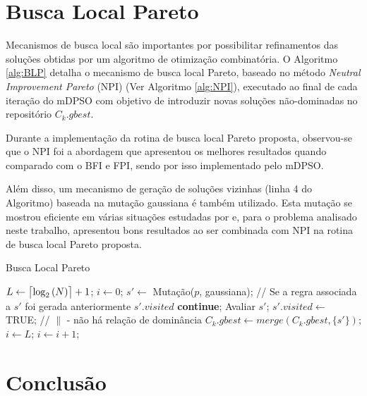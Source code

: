 \documentclass[
	12pt,				%
	openany,			%
	oneside,	
	a4paper,			%
	brazil,				%
	]{unimontes-ppgmsc-abntex2}
\DeclarePairedDelimiter{\ceil}{\lceil}{\rceil}
\begin{document}
\section{Busca Local Pareto}
\label{sec:mdpso_busca_local}

Mecanismos de busca local são importantes por possibilitar refinamentos das soluções obtidas por um algoritmo de otimização combinatória. O Algoritmo \ref{alg:BLP} detalha o mecanismo de busca local Pareto, baseado no método {\em Neutral Improvement Pareto} (NPI) (Ver Algoritmo \ref{alg:NPI}), executado ao final de cada iteração do mDPSO com objetivo de introduzir novas soluções não-dominadas no repositório $C_k.gbest$. 

Durante a implementação da rotina de busca local Pareto proposta, observou-se que o NPI foi a abordagem que apresentou os melhores resultados quando comparado com o BFI e FPI, sendo por isso implementado pelo mDPSO. 

Além disso, um mecanismo de geração de soluções vizinhas (linha 4 do Algoritmo) baseada na mutação gaussiana é também utilizado. Esta mutação se mostrou eficiente em várias situações estudadas por  e, para o problema analisado neste trabalho, apresentou bons resultados ao ser combinada com NPI na rotina de busca local Pareto proposta.  

\begin{algorithm}[ht]
\caption{Busca Local Pareto}
\label{alg:BLP}
\begin{algorithmic}[1]
\State $L \leftarrow \ceil[\big]{\log_{2}{(N)}} + 1$;
\State $i \leftarrow 0$;
  \State $s' \leftarrow $ Mutação($p$, gaussiana);
  \State // Se a regra associada a $s'$ foi gerada anteriormente $s'.visited$
    \State \textbf{continue};
  \EndIf
  \State Avaliar $s'$;
  \State $s'.visited \leftarrow$ TRUE;
   // $\parallel$ - \small{não há relação de dominância}
  	\State $C_k.gbest \leftarrow merge(C_k.gbest, \{s'\})$;
    \State $i \leftarrow L$;
  \EndIf
  \State $i \leftarrow i + 1$;
\EndWhile
\end{algorithmic}
\end{algorithm}


\section{Conclusão}
\end{document}
